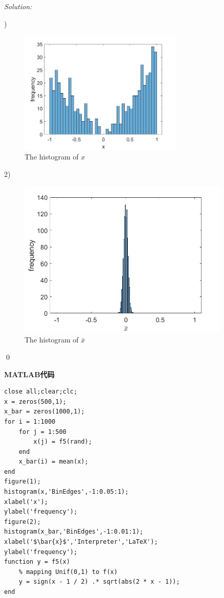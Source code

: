 \documentclass[12pt]{article}
\newenvironment{sol}
    {\emph{Solution:}
    }
    {
    \qed
    }
\begin{document}
\begin{sol}
)
\begin{figure}[h]
\centering
\includegraphics[width=0.7\textwidth]{x_histogram.jpg}
\caption{The histogram of $x$}
\end{figure}

2)

\begin{figure}[h]
\centering
\includegraphics[width=0.9\textwidth]{xbar_histogram.jpg}
\caption{The histogram of $\bar{x}$}
\end{figure}
\end{sol}

\newpage
\textbf{MATLAB代码}
\begin{lstlisting}
close all;clear;clc;
x = zeros(500,1);
x_bar = zeros(1000,1);
for i = 1:1000
    for j = 1:500
        x(j) = f5(rand);
    end
    x_bar(i) = mean(x);
end
figure(1);
histogram(x,'BinEdges',-1:0.05:1);
xlabel('x');
ylabel('frequency');
figure(2);
histogram(x_bar,'BinEdges',-1:0.01:1);
xlabel('$\bar{x}$','Interpreter','LaTeX');
ylabel('frequency');
function y = f5(x)
    % mapping Unif(0,1) to f(x)
    y = sign(x - 1 / 2) .* sqrt(abs(2 * x - 1));
end
\end{lstlisting}
\end{document}
